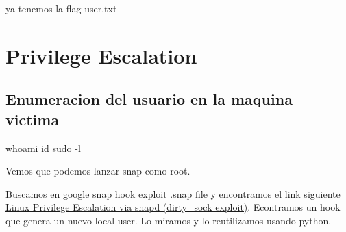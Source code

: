 \documentclass{assets/ipesethesis}
\newenvironment{Shaded}{\begin{snugshade}}{\end{snugshade}}
\newcommand{\FunctionTok}[1]{\textcolor[rgb]{0.00,0.00,0.00}{#1}}
\newcommand{\NormalTok}[1]{#1}
\begin{document}
ya tenemos la flag user.txt

\hypertarget{privilege-escalation-2}{%
\section*{Privilege Escalation}\label{privilege-escalation-2}}

\hypertarget{enumeracion-del-usuario-en-la-maquina-victima-2}{%
\subsection*{Enumeracion del usuario en la maquina victima}\label{enumeracion-del-usuario-en-la-maquina-victima-2}}

\begin{Shaded}
\begin{Highlighting}[]
\FunctionTok{whoami}
\FunctionTok{id}
\FunctionTok{sudo}\NormalTok{ -l}
\end{Highlighting}
\end{Shaded}

Vemos que podemos lanzar snap como root.

Buscamos en google snap hook exploit .snap file y encontramos el link siguiente
\href{https://initblog.com/2019/dirty-sock/}{Linux Privilege Escalation via snapd (dirty\_sock exploit)}. Econtramos
un hook que genera un nuevo local user. Lo miramos y lo reutilizamos usando python.
\end{document}
